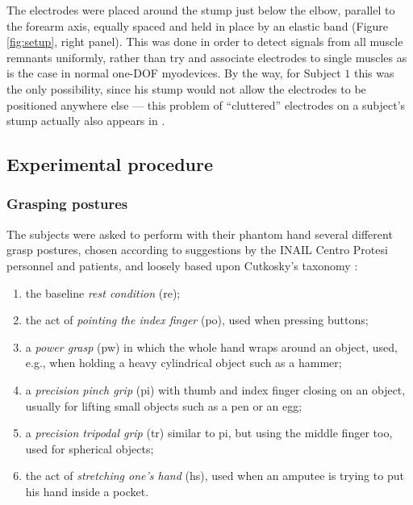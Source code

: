 \documentclass[review,authoryear]{elsarticle}
\def\re{\textsf{re}}
\def\po{\textsf{po}}
\def\pw{\textsf{pw}}
\def\pi{\textsf{pi}}
\def\tr{\textsf{tr}}
\def\hs{\textsf{hs}}
\renewcommand{\cite}{\citep}
\begin{document}
The electrodes were placed around the stump just below the elbow, parallel
to the forearm axis, equally spaced and held in place by an elastic band
(Figure \ref{fig:setup}, right panel). This was done
in order to detect signals from all muscle remnants uniformly,
rather than try and associate electrodes to single muscles
as is the case in normal one-DOF myodevices. By the way, for Subject $1$
this was the only possibility, since his stump
would not allow the electrodes to be positioned anywhere else --- this problem
of ``cluttered'' electrodes on a subject's stump actually also appears in
\cite{sebelius}.

\subsection{Experimental procedure}

\subsubsection{Grasping postures}

The subjects were asked to perform with their phantom hand several
different grasp postures, chosen according to suggestions by the
INAIL Centro Protesi personnel and patients, and loosely based upon
Cutkosky's taxonomy \cite{cutkosky}:

\begin{enumerate}

  \item the baseline \emph{rest condition} (\re);

  \item the act of \emph{pointing the index finger} (\po), used when pressing buttons;

	\item a \emph{power grasp} (\pw) in which the whole hand wraps around an object,
		used, e.g., when holding a heavy cylindrical object such as a hammer;
		
	\item a \emph{precision pinch grip} (\pi) with thumb and index finger closing on
	 	an object, usually for lifting small objects such as a pen or an egg;
	
	\item a \emph{precision tripodal grip} (\tr) similar to \pi, but using the
		middle finger too, used for spherical objects;
		
	\item the act of \emph{stretching one's hand} (\hs), used when an amputee is trying
		to put his hand inside a pocket. 

\end{enumerate}
	
\end{document}

